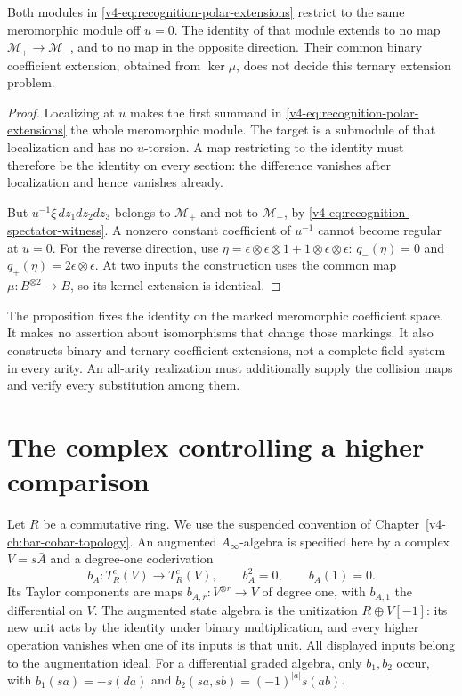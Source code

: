 \begin{proposition}
\label{v4-prop:recognition-ternary-poles}
Both modules in \eqref{v4-eq:recognition-polar-extensions} restrict
to the same meromorphic module off \(u=0\). The identity of that
module extends to no map \(\mathcal M_+\to\mathcal M_-\), and
to no map in the opposite direction. Their common binary
coefficient extension, obtained from \(\ker\mu\), does not
decide this ternary extension problem.
\end{proposition}

\begin{proof}
Localizing at \(u\) makes the first summand in
\eqref{v4-eq:recognition-polar-extensions} the whole meromorphic
module. The target is a submodule of that localization and has
no \(u\)-torsion. A map restricting to the identity must therefore
be the identity on every section: the difference vanishes after
localization and hence vanishes already.

But \(u^{-1}\xi\,dz_1dz_2dz_3\) belongs to \(\mathcal M_+\)
and not to \(\mathcal M_-\), by
\eqref{v4-eq:recognition-spectator-witness}. A nonzero constant
coefficient of \(u^{-1}\) cannot become regular at \(u=0\).
For the reverse direction, use
\(\eta=\epsilon\otimes\epsilon\otimes1
          +1\otimes\epsilon\otimes\epsilon\):
\(q_-(\eta)=0\) and \(q_+(\eta)=2\epsilon\otimes\epsilon\).
At two inputs the construction uses the common map
\(\mu:B^{\otimes2}\to B\), so its kernel extension is identical.
\end{proof}

The proposition fixes the identity on the marked meromorphic
coefficient space. It makes no assertion about isomorphisms that
change those markings. It also constructs binary and ternary
coefficient extensions, not a complete field system in every
arity. An all-arity realization must additionally supply the
collision maps and verify every substitution among them.

\section{The complex controlling a higher comparison}
\label{v4-sec:recognition-comparison-tower}

Let \(R\) be a commutative ring. We use the suspended convention
of Chapter~\ref{v4-ch:bar-cobar-topology}. An augmented
\(A_\infty\)-algebra is specified here by a complex
\(V=s\bar A\) and a degree-one coderivation
\[
 b_A:T_R^c(V)\longrightarrow T_R^c(V),\qquad b_A^2=0,
 \qquad b_A(1)=0.
\]
Its Taylor components are maps \(b_{A,r}:V^{\otimes r}\to V\)
of degree one, with \(b_{A,1}\) the differential on \(V\).
The augmented state algebra is the unitization
\(R\oplus V[-1]\): its new unit acts by the identity under
binary multiplication, and every higher operation vanishes when
one of its inputs is that unit. All displayed inputs belong to
the augmentation ideal. For a differential graded
algebra, only \(b_1,b_2\) occur, with
\(b_1(sa)=-s(da)\) and \(b_2(sa,sb)=(-1)^{|a|}s(ab)\).

